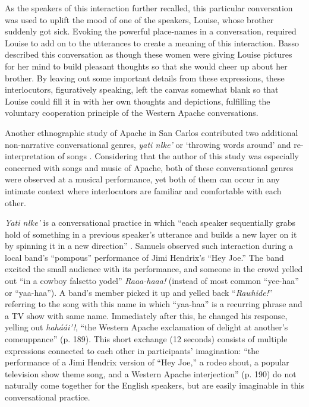 \documentclass[12pt, draft]{article}
\begin{document}
As the speakers of this interaction further recalled, this particular conversation was used to uplift the mood of one of the speakers, Louise, whose brother suddenly got sick. Evoking the powerful place-names in a conversation, required Louise to add on to the utterances to create a meaning of this interaction. Basso described this conversation as though these women were giving Louise pictures for her mind to build pleasant thoughts so that she would cheer up about her brother. By leaving out some important details from these expressions, these interlocutors, figuratively speaking, left the canvas somewhat blank so that Louise could fill it in with her own thoughts and depictions, fulfilling the voluntary cooperation principle of the Western Apache conversations. 

Another ethnographic study of Apache in San Carlos contributed two additional non-narrative conversational genres, \textit{yati n\l ke'} or `throwing words around' and re-interpretation of songs \parencite{samuels2004}. Considering that the author of this study was especially concerned with songs and music of Apache, both of these conversational genres were observed at a musical performance, yet both of them can occur in any intimate context where interlocutors are familiar and comfortable with each other. 

\textit{Yati n\l ke'} is a conversational practice in which ``each speaker sequentially grabs hold of something in a previous speaker's utterance and builds a new layer on it by spinning it in a new direction'' \textcite[p. 190]{samuels2004}. Samuels observed such interaction during a local band's ``pompous'' performance of Jimi Hendrix's ``Hey Joe.'' The band excited the small audience with its performance, and someone in the crowd yelled out ``in a cowboy falsetto yodel'' \textit{Raaa-haaa!} (instead of most common ``yee-haa'' or ``yaa-haa''). A band's member picked it up and yelled back ``\textit{Rawhide!}'' referring to the song with this name in which ``yaa-haa'' is a recurring phrase and a TV show with same name. Immediately after this, he changed his response, yelling out \textit{hah\'a\'ai'!}, ``the Western Apache exclamation of delight at another's comeuppance'' (p. 189). This short exchange (12 seconds) consists of multiple expressions connected to each other in participants' imagination: ``the performance of a Jimi Hendrix version of ``Hey Joe,'' a rodeo shout, a popular television show theme song, and a Western Apache interjection'' (p. 190) do not naturally come together for the English speakers, but are easily imaginable in this conversational practice. 
\end{document}
